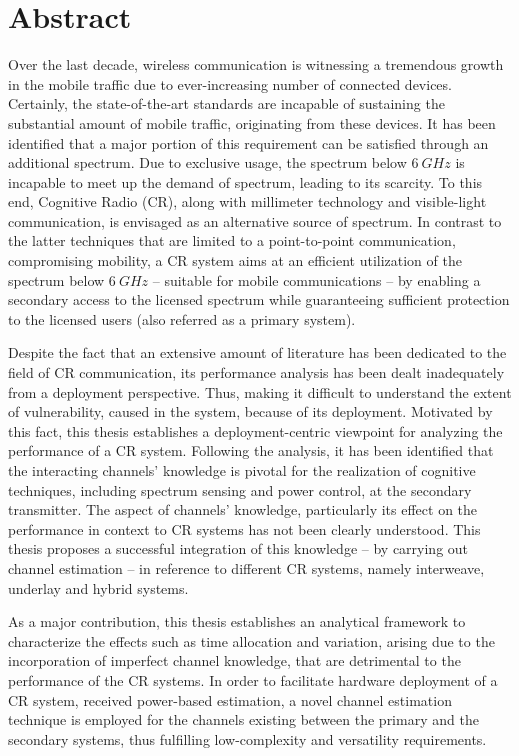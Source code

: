
\chapter*{Abstract}
Over the last decade, wireless communication is witnessing a tremendous growth in the mobile traffic due to ever-increasing number of connected devices. Certainly, the state-of-the-art standards are incapable of sustaining the substantial amount of mobile traffic, originating from these devices. It has been identified that a major portion of this requirement can be satisfied through an additional spectrum. Due to exclusive usage, the spectrum below $\SI{6}{GHz}$ is incapable to meet up the demand of spectrum, leading to its scarcity. To this end, Cognitive Radio (CR), along with millimeter technology and visible-light communication, is envisaged as an alternative source of spectrum. In contrast to the latter techniques that are limited to a point-to-point communication, compromising mobility, a CR system aims at an efficient utilization of the spectrum below $\SI{6}{GHz}$ -- suitable for mobile communications -- by enabling a secondary access to the licensed spectrum while guaranteeing sufficient protection to the licensed users (also referred as a primary system). %


Despite the fact that an extensive amount of literature has been dedicated to the field of CR communication, its performance analysis has been dealt inadequately from a deployment perspective. Thus, making it difficult to understand the extent of vulnerability, caused in the system, because of its deployment. Motivated by this fact, this thesis establishes a deployment-centric viewpoint for analyzing the performance of a CR system. Following the analysis, it has been identified that the interacting channels' knowledge is pivotal for the realization of cognitive techniques, including spectrum sensing and power control, at the secondary transmitter. The aspect of channels' knowledge, particularly its effect on the performance in context to CR systems has not been clearly understood. This thesis proposes a successful integration of this knowledge -- by carrying out channel estimation -- in reference to different CR systems, namely interweave, underlay and hybrid systems. 

As a major contribution, this thesis establishes an analytical framework to characterize the effects such as time allocation and variation, arising due to the incorporation of imperfect channel knowledge, that are detrimental to the performance of the CR systems. In order to facilitate hardware deployment of a CR system, received power-based estimation, a novel channel estimation technique is employed for the channels existing between the primary and the secondary systems, thus fulfilling low-complexity and versatility requirements. 

